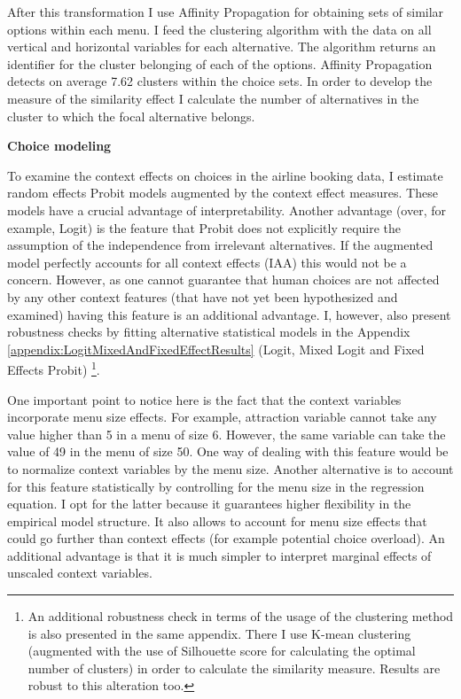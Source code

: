 \documentclass[a4paper,12pt]{article}
\begin{document}
After this transformation I use Affinity Propagation for obtaining sets of similar options within each menu. I feed the clustering algorithm with the data on all vertical and horizontal variables for each alternative. The algorithm returns an identifier for the cluster belonging of each of the options. Affinity Propagation detects on average 7.62 clusters within the choice sets. In order to develop the measure of the similarity effect I calculate the number of alternatives in the cluster to which the focal alternative belongs.

\textbf{Choice modeling}

To examine the context effects on choices in the airline booking data, I estimate random effects Probit models augmented by the context effect measures. These models have a crucial advantage of interpretability. Another advantage (over, for example, Logit) is the feature that Probit does not explicitly require the assumption of the independence from irrelevant alternatives. If the augmented model perfectly accounts for all context effects (IAA) this would not be a concern. However, as one cannot guarantee that human choices are not affected by any other context features (that have not yet been hypothesized and examined) having this feature is an additional advantage. I, however, also present robustness checks by fitting alternative statistical models in the Appendix \ref{appendix:LogitMixedAndFixedEffectResults} (Logit, Mixed Logit and Fixed Effects Probit) \footnote{An additional robustness check in terms of the usage of the clustering method is also presented in the same appendix. There I use K-mean clustering (augmented with the use of Silhouette score \citep{rousseeuw1987silhouettes} for calculating the optimal number of clusters) in order to calculate the similarity measure. Results are robust to this alteration too.}.

One important point to notice here is the fact that the context variables incorporate menu size effects. For example, attraction variable cannot take any value higher than 5 in a menu of size 6. However, the same variable can take the value of 49 in the menu of size 50. One way of dealing with this feature would be to normalize context variables by the menu size. Another alternative is to account for this feature statistically by controlling for the menu size in the regression equation. I opt for the latter because it guarantees higher flexibility in the empirical model structure. It also allows to account for menu size effects that could go further than context effects (for example potential choice overload). An additional advantage is that it is much simpler to interpret marginal effects of unscaled context variables.
\end{document}
